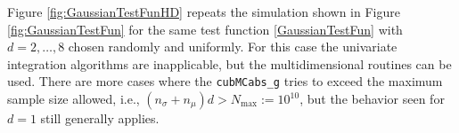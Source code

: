 \documentclass{iitthesis}
\theoremstyle{definition}
\begin{document}
Figure \ref{fig:GaussianTestFunHD} repeats the simulation shown in Figure \ref{fig:GaussianTestFun} for the same test function \eqref{GaussianTestFun} with $d=2, \ldots, 8$ chosen randomly and uniformly.  For this case the univariate integration algorithms are inapplicable, but the multidimensional routines can be used. There are more cases where the {\tt cubMCabs\_g} tries to exceed the maximum sample size allowed, i.e., $(n_{\sigma}+n_\mu)d > N_{\max}:=10^{10}$, but the behavior seen for $d=1$ still generally applies.  


%
\end{document}
